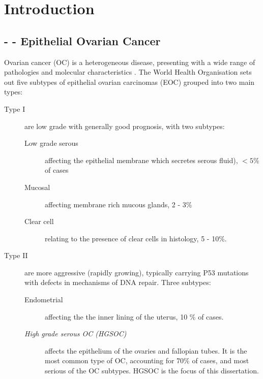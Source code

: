 \documentclass[tikz, 11pt,a4paper,oneside,fleqn, draft]{article}
\begin{document}
\maketitle
\newpage

\tableofcontents

\newpage

\section{Introduction}

\subsection{- - Epithelial Ovarian Cancer}
\label{sec-epithelial-ovarian-cancer}


Ovarian cancer (OC) is a heterogeneous disease, presenting with a wide range of pathologies and molecular characteristics .  The World Health Organisation sets out five subtypes of epithelial ovarian carcinomas (EOC) grouped into two main types\cite{Kossai2018, Lisio2019}: 

\begin{description}
\item[Type I] are low grade with generally good prognosis, with two subtypes:
\begin{description}
\item[Low grade serous] affecting the epithelial membrane which secretes serous fluid), $< 5$\% of cases
\item[Mucosal] affecting membrane rich mucous glands, 2 - 3\% 
\item[Clear cell] relating to the presence of clear cells in histology, 5 - 10\%.
\end{description}
\item[Type II] are more aggressive (rapidly growing), typically carrying P53 mutations with defects in mechanisms of DNA repair. Three subtypes:
\begin{description}
\item[Endometrial] affecting the the inner lining of the uterus, 10 \% of cases.
\item[\emph{High grade serous OC (HGSOC)}] affects the epithelium of the ovaries and fallopian tubes.  It is the most common type of OC, accounting for 70\% of cases, and most serious of the OC subtypes.  HGSOC is the focus of this dissertation.
\end{description}
\end{description}
\end{document}
